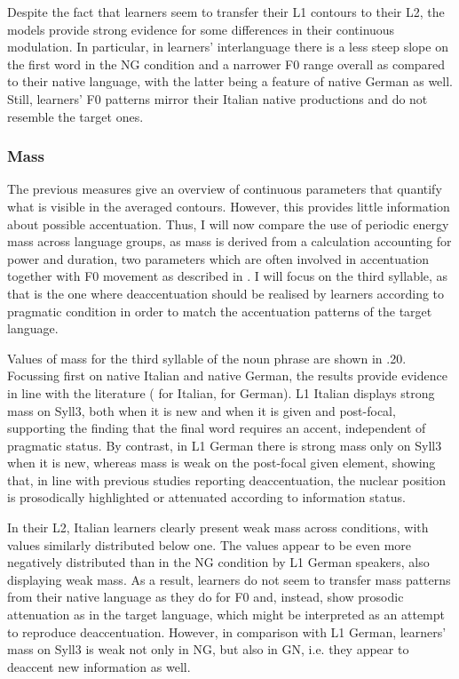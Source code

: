 Despite the fact that learners seem to transfer their L1 contours to their L2, the models provide strong evidence for some differences in their continuous modulation. In particular, in learners’ interlanguage there is a less steep slope on the first word in the NG condition and a narrower F0 range overall as compared to their native language, with the latter being a feature of native German as well. Still, learners’ F0 patterns mirror their Italian native productions and do not resemble the target ones.

\subsubsection{Mass}
\hypertarget{Toc191305913}{}
The previous measures give an overview of continuous parameters that quantify what is visible in the averaged contours. However, this provides little information about possible accentuation. Thus, I will now compare the use of periodic energy mass across language groups, as mass is derived from a calculation accounting for power and duration, two parameters which are often involved in accentuation together with F0 movement as described in . I will focus on the third syllable, as that is the one where deaccentuation should be realised by learners according to pragmatic condition in order to match the accentuation patterns of the target language.

Values of mass for the third syllable of the noun phrase are shown in .20. Focussing first on native Italian and native German, the results provide evidence in line with the literature ( for Italian,  for German). L1 Italian displays strong mass on Syll3, both when it is new and when it is given and post-focal, supporting the finding that the final word requires an accent, independent of pragmatic status. By contrast, in L1 German there is strong mass only on Syll3 when it is new, whereas mass is weak on the post-focal given element, showing that, in line with previous studies reporting deaccentuation, the nuclear position is prosodically highlighted or attenuated according to information status.

In their L2, Italian learners clearly present weak mass across conditions, with values similarly distributed below one. The values appear to be even more negatively distributed than in the NG condition by L1 German speakers, also displaying weak mass. As a result, learners do not seem to transfer mass patterns from their native language as they do for F0 and, instead, show prosodic attenuation as in the target language, which might be interpreted as an attempt to reproduce deaccentuation. However, in comparison with L1 German, learners’ mass on Syll3 is weak not only in NG, but also in GN, i.e. they appear to deaccent new information as well.

